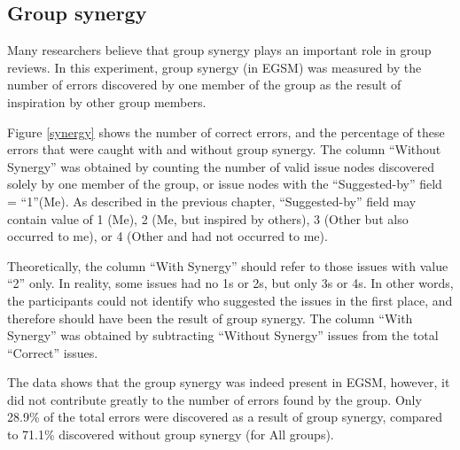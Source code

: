 \subsection{Group synergy}

Many researchers believe that group synergy plays an important role in
group reviews. In this experiment, group synergy (in EGSM) was measured
by the number of errors  discovered by one member of the group as the
result of inspiration by other group members.

Figure \ref{synergy} shows the number of correct errors,
and the percentage of these errors that were caught with and without group
synergy. The column ``Without Synergy'' was obtained by counting the
number of valid issue nodes discovered solely by one member
of the group, or issue nodes with
the ``Suggested-by'' field = ``1''(Me).  As described in the previous
chapter, ``Suggested-by'' field may contain value of 1 (Me), 2 (Me,
but inspired by others), 3 (Other but also occurred to me), or 4
(Other and had not occurred to me). 

Theoretically, the column ``With Synergy'' should refer to those
issues with value ``2'' only. In reality, some issues had 
no 1s or 2s, but only 3s or 4s. In other words, the participants
could not identify who suggested the issues in the first place, and
therefore should have been the result of group synergy.
The column ``With Synergy'' was obtained by subtracting 
``Without Synergy'' issues from the total ``Correct'' issues.


The data shows that the group synergy was indeed present in EGSM,
however, it did not contribute greatly to the number of errors found
by the group. Only  28.9\% of the total errors were discovered as a
result of group synergy, compared to
71.1\% discovered without group synergy (for All groups).

